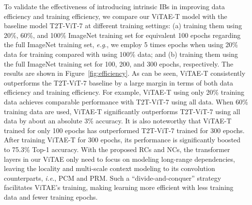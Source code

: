 \documentclass[twocolumn]{svjour3}          \smartqed  \usepackage{natbib}
\newcommand{\ie}{i.e}
\newcommand{\eg}{e.g}
\def\onedot{.\xspace}
\def\eg{\emph{e.g}\onedot}
\def\ie{\emph{i.e}\onedot}
\begin{document}
To validate the effectiveness of introducing intrinsic IBs in improving data efficiency and training efficiency, we compare our ViTAE-T model with the baseline model T2T-ViT-7 at different training settings:
 (a) training them using 20\%, 60\%, and 100\% ImageNet training set for equivalent 100 epochs regarding the full ImageNet training set, \eg, we employ 5 times epochs when using 20\% data for training compared with using 100\% data; 
and (b) training them using the full ImageNet training set for 100, 200, and 300 epochs, respectively. 
The results are shown in Figure~\ref{fig:efficiency}. As can be seen, ViTAE-T consistently outperforms the T2T-ViT-7 baseline by a large margin in terms of both data efficiency and training efficiency. For example, ViTAE-T using only 20\% training data achieves comparable performance with T2T-ViT-7 using all data. When 60\% training data are used, ViTAE-T significantly outperforms T2T-ViT-7 using all data by about an absolute 3\% accuracy. It is also noteworthy that ViTAE-T trained for only 100 epochs has outperformed T2T-ViT-7 trained for 300 epochs. After training ViTAE-T for 300 epochs, its performance is significantly boosted to 75.3\% Top-1 accuracy. With the proposed RCs and NCs, the transformer layers in our ViTAE only need to focus on modeling long-range dependencies, leaving the locality and multi-scale context modeling to its convolution counterparts, \ie, PCM and PRM. Such a ``divide-and-conquer'' strategy facilitates ViTAE's training, making learning more efficient with less training data and fewer training epochs.
\end{document}
